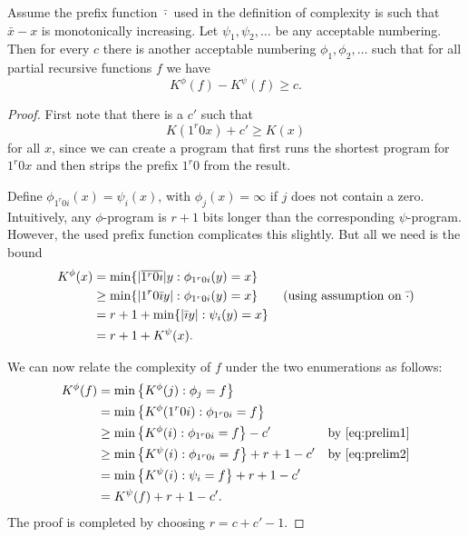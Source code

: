\documentclass{style/llncs}
\newcommand{\tn}[1]{\textnormal{#1}}
\begin{document}
\begin{lemma}
Assume the prefix function $\bar\cdot$ used in the definition of complexity is such that $\bar x-x$ is monotonically increasing. Let $\psi_1,\psi_2,\ldots$ be any acceptable numbering. Then for every $c$ there is another acceptable numbering $\phi_1,\phi_2,\ldots$ such that for all partial recursive functions $f$ we have
\[
K^\phi(f)-K^\psi(f) \ge c.
\] \label{lemma:building-block}
\end{lemma}
\begin{proof}
First note that there is a $c'$ such that 
\begin{equation}
	K(1^r 0  x) + c' \geq K(x) \label{eq:prelim1}
\end{equation}
for all $x$, since we can create a program that first runs the shortest program for $1^r 0 x$ and then strips the prefix $1^r 0$ from the result.

Define $\phi_{1^r0i}(x) = \psi_{i}(x)$, with $\phi_{j}(x) = \infty$ if $j$ does not contain a zero. Intuitively, any $\phi$-program is $r+1$ bits longer than the corresponding $\psi$-program. However, the used prefix function complicates this slightly. But all we need is the bound
\begin{equation}\label{eq:prelim2}\begin{split}
K^\phi(x) &= \min \{ |\overline{1^r 0 \imath}| y : \phi_{1^r 0 i}(y) = x \}\\
&  \ge \min\{|1^r0\bar\imath y| : \phi_{1^r 0 i}(y) = x \}\qquad\tn{(using assumption on $\bar\cdot$)}\\
& = r+1 +\min\{|\bar\imath y| : \psi_i(y) = x \}\\
& = r+1+K^\psi(x).
\end{split}\end{equation}

We can now relate the complexity of $f$ under the two enumerations as follows:
\begin{align*}
K^\phi(f) &= \min\left\{ K^\phi(j) : \phi_j = f \right\}& \\
       &= \min\left\{ K^\phi(1^r0i) : \phi_{1^r0i} = f \right\}& \\
       &\ge  \min\left\{ K^\phi(i) : \phi_{1^r0i} = f \right\}-c'&\text{by~\eqref{eq:prelim1}}\\
       &\geq \min\left\{ K^\psi(i)  : \phi_{1^r0i} = f \right\}+r+1-c'& \text{by \eqref{eq:prelim2}}\\
       &= \min\left\{ K^\psi(i) : \psi_{i} = f \right\} + r+1 -c'& \\
       &= K^\psi(f) + r + 1 - c'.
\end{align*}
The proof is completed by choosing $r=c+c'-1$.
\end{proof}
\end{document}
